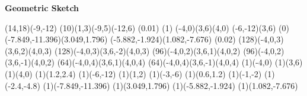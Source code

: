 


\begin{center}
{\Huge \bf{Geometric Sketch}}
\bigskip

\begin{lapdf}(14,18)(-9,-12)
 \Lingrid(10)(1,3)(-9,5)(-12,6)
 \Setwidth(0.01)
 \Dash(1)
 \Polygon(-4,0)(3,6)(4,0) \Stroke
 \Polygon(-6,-12)(3,6) \Stroke
 \Dash(0)
 \Line(-7.849,-11.396)(3.049,1.796) \Stroke
 \Line(-5.882,-1.924)(1.082,-7.676) \Stroke
 \Setwidth(0.02)
 \Red
 \Rcurve(128)(-4,0,3)(3,6,2)(4,0,3) \Stroke
 \Rcurve(128)(-4,0,3)(3,6,-2)(4,0,3) \Stroke
 \Green
 \Rcurve(96)(-4,0,2)(3,6,1)(4,0,2) \Stroke
 \Rcurve(96)(-4,0,2)(3,6,-1)(4,0,2) \Stroke
 \Blue
 \Rcurve(64)(-4,0,4)(3,6,1)(4,0,4) \Stroke
 \Rcurve(64)(-4,0,4)(3,6,-1)(4,0,4) \Stroke
 \Point(1)(-4,0)
 \Point(1)(3,6)
 \Point(1)(4,0)
 \Point(1)(1.2,2.4)
 \Point(1)(-6,-12)
 \Point(1)(1,2)
 \Point(1)(-3,-6)
 \Point(1)(0.6,1.2)
 \Point(1)(-1,-2)
 \Point(1)(-2.4,-4.8)
 \Point(1)(-7.849,-11.396)
 \Point(1)(3.049,1.796)
 \Point(1)(-5.882,-1.924)
 \Point(1)(1.082,-7.676)
\end{lapdf}
\end{center}

